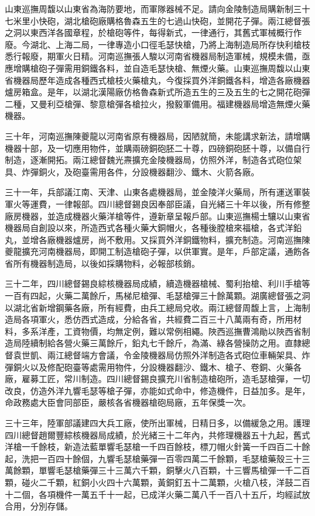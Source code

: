 \begin{pinyinscope}
山東巡撫周馥以山東省為海防要地，而軍隊器械不足。請向金陵制造局購新制三十七米里小快砲，湖北槍砲廠購格魯森五生的七過山快砲，並開花子彈。兩江總督張之洞以東西洋各國章程，於槍砲等件，每得新式，一律通行，其舊式軍械概行作廢。今湖北、上海二局，一律專造小口徑毛瑟快槍，乃將上海制造局所存快利槍枝悉行報廢，期軍火日精。河南巡撫張人駿以河南省機器局制造軍械，規模未備，亟應增購槍砲子彈需用銅鐵各料，並自造毛瑟快槍、無煙火藥。山東巡撫周馥以山東省機器局歷年造成各種西式槍枝火藥槍丸，今復採買外洋銅鐵各料，增造各廠機器爐房箱盒。是年，以湖北漢陽廠仿格魯森新式所造五生的三及五生的七之開花砲彈二種，又曼利亞槍彈、黎意槍彈各槍拉火，撥毅軍備用。福建機器局增造無煙火藥機器。

三十年，河南巡撫陳夔龍以河南省原有機器局，因陋就簡，未能講求新法，請增購機器十部，及一切應用物件，並購兩磅銅砲胚二十尊，四磅銅砲胚十尊，以備自行制造，逐漸開拓。兩江總督魏光燾擴充金陵機器局，仿照外洋，制造各式砲位架具、炸彈銅火，及砲臺需用各件，分設機器翻沙、鐵木、火箭各廠。

三十一年，兵部議江南、天津、山東各處機器局，並金陵洋火藥局，所有運送軍裝軍火等運費，一律報部。四川總督錫良因奉部臣議，自光緒三十年以後，所有修整廠房機器，並造成機器火藥洋槍等件，遵新章呈報戶部。山東巡撫楊士驤以山東省機器局自創設以來，所造西式各種火藥大銅帽火，各種後膛槍來福槍，各式洋鉛丸，並增各廠機器爐房，尚不敷用。又採買外洋銅鐵物料，擴充制造。河南巡撫陳夔龍擴充河南機器局，即開工制造槍砲子彈，以供軍實。是年，戶部定議，通飭各省所有機器制造局，以後如採購物料，必報部核銷。

三十二年，四川總督錫良綜核機器局成績，續造機器槍械、蜀利抬槍、利川手槍等一百有四起，火藥二萬餘斤，馬梯尼槍彈、毛瑟槍彈三十餘萬顆。湖廣總督張之洞以湖北省新增鋼藥各廠，所有經費，由兵工總局兌收。兩江總督周馥上言，上海制造局各項軍火，悉仿西式造成，分給各省，共經費二百三十八萬兩有奇，所用材料，多系洋產，工資物價，均無定例，難以常例相繩。陜西巡撫曹鴻勛以陜西省制造局陸續制給各營火藥三萬餘斤，鉛丸七千餘斤，為滿、綠各營操防之用。直隸總督袁世凱、兩江總督端方會議，令金陵機器局仿照外洋制造各式砲位車輛架具、炸彈銅火以及修配砲臺等處需用物件，分設機器翻沙、鐵木、槍子、卷銅、火藥各廠，雇募工匠，常川制造。四川總督錫良擴充川省制造槍砲所，造毛瑟槍彈，一切改良，仿造外洋九響毛瑟等槍子彈，亦能如式命中，修造機件，日益加多。是年，命政務處大臣會同部臣，嚴核各省機器槍砲局廠，五年保獎一次。

三十三年，陸軍部議建四大兵工廠，使所出軍械，日精日多，以備緩急之用。護理四川總督趙爾豐綜核機器局成績，於光緒三十二年內，共修理機器五十九起，舊式洋槍一千餘枝，新造法藍單響毛瑟槍一千四百餘枝，標刀帽火針簧一千四百二十餘起，洗把一百四十餘個，九響毛瑟槍藥彈一百零四萬二千餘顆，毛瑟槍藥殼三十三萬餘顆，單響毛瑟槍藥彈三十三萬六千顆，銅擊火八百顆，十三響馬槍彈一千二百顆，碰火二千顆，紅銅小火四十六萬顆，黃銅釘五十二萬顆，火槍八枝，洋鼓二百十二個，各項機件一萬五千十一起，已成洋火藥二萬八千一百八十五斤，均經試放合用，分別存儲。


\end{pinyinscope}
